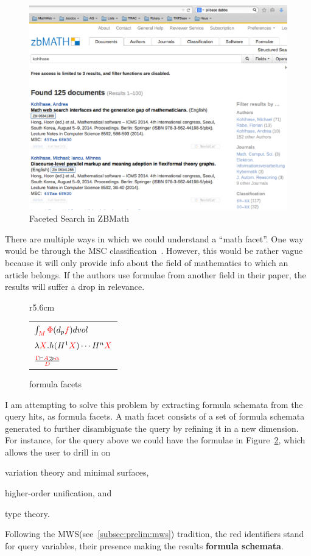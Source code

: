 \documentclass[a4paper,oneside]{article}
\def\red#1{\textcolor{red}{#1}}
\def\MWS{\textsf{MWS}\xspace}
\begin{document}
\begin{figure}[ht]\centering
\includegraphics[width=12.1cm]{img/faceted-search.pdf}
\caption{Faceted Search in ZBMath}\label{fig:zbFaceted}
\end{figure}

There are multiple ways in which we could understand a ``math facet''.  One way
would be through the MSC classification~\cite{MSC-SKOS}.  However, this would
be rather vague because it will only provide info about the field of
mathematics to which an article belongs. If the authors use formulae from
another field in their paper, the results will suffer a drop in relevance.

\begin{figure}r{5.6cm}\vspace*{-1em}
\begin{tabular}{l}
$\int_{\red{M}}{\red\Phi(d_p\red{f}) dvol}$\\[1ex]
$\lambda{\red{X}}.h(H^1\red{X})\cdots{H^n\red{X}}$\\[1ex]
$\frac{\red\Gamma\vdash\red{A}\gg\red\alpha}{\red{D}}$
\end{tabular}\vspace*{-.5em}
\caption{formula facets}\label{fig:formula-facets}\vspace*{-1em}
\end{figure}

I am attempting to solve this problem by extracting formula schemata from the
query hits, as formula facets. A math facet consists of a set of formula
schemata generated to further disambiguate the query by refining it in a new
dimension.  For instance, for the query above we could have the formulae in
Figure~\ref{fig:formula-facets}, which allows the user to drill in on
\begin{inparaenum}[\em i\rm)]
\item variation theory and minimal surfaces,
\item higher-order unification, and
\item type theory.
\end{inparaenum}
Following the \MWS (see~\ref{subsec:prelim:mws}) tradition, the red identifiers
stand for query variables, their presence making the results \textbf{formula
schemata}.
\end{document}
